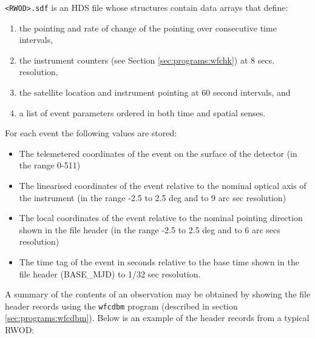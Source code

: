 {\tt \verb+<+RWOD\verb+>+.sdf} is an HDS file whose structures contain
data arrays that define:

\begin{enumerate}

\item the pointing and rate of change of the pointing over consecutive
time  intervals,

\item the instrument counters (see Section \ref{sec:programs:wfchk}) at
8 secs. resolution,

\item the satellite location and instrument pointing at 60 second
intervals, and

\item a list of event parameters ordered in both time and spatial senses.

\end{enumerate}

For each event the following values are stored:

\begin{itemize}

\item The telemetered coordinates of the event on the surface of the
detector (in the range 0-511)

\item The linearised coordinates of the event relative to the nominal
optical axis of the instrument (in the range -2.5 to 2.5 deg and to 9
arc sec resolution)

\item The local coordinates of the event relative to the nominal
pointing direction shown in the file header (in the range -2.5 to 2.5
deg and to 6 arc secs resolution)

\item The time tag of the event in seconds relative to the base time
shown in the file header (BASE\_MJD) to 1/32 sec resolution.

\end{itemize}

A summary of the contents of an observation may be obtained by showing
the file header records using the {\tt wfcdbm} program (described in
section \ref{sec:programs:wfcdbm}).  Below is an example of the header
records from a typical RWOD:

